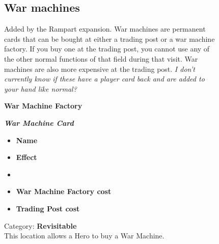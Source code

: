 \begin{figure}[h]
  \begin{minipage}[t]{0.5\textwidth}
    \vspace{0pt}
    \subsection*{War machines}
    Added by the Rampart expansion.
    War machines are permanent cards that can be bought at either a trading post or a war machine factory.
    If you buy one at the trading post, you cannot use any of the other normal functions of that field during that visit.
    War machines are also more expensive at the trading post.
    \textit{I don't currently know if these have a player card back and are added to your hand like normal?}\par
    \smallskip
    \raggedright\textbf{War Machine Factory}
      \caption{\scriptsize Category: \scriptsize\textbf{Revisitable}\\This location allows a Hero to buy a War Machine.}
  \end{minipage}
  \begin{minipage}[t]{0.4\textwidth}
    \vspace{0pt}
    \centering
    \begin{scriptsize}
    \end{scriptsize}
    \break
    \footnotesize{\textbf{\textit{\textcolor{darkcandyapplered}{War Machine Card}}}}
    \scriptsize
    \begin{multicols}{2}
      \begin{itemize}
        \item[\textbf{1.}] \textbf{Name}
        \item[\textbf{2.}] \textbf{Effect}
        \item[\textbf{\phantom{.}}] \phantom{.}
        \item[\textbf{3.}] \textbf{War Machine Factory cost}
        \item[\textbf{4.}] \textbf{Trading Post cost}
      \end{itemize}
    \end{multicols}
  \end{minipage}
\end{figure}

